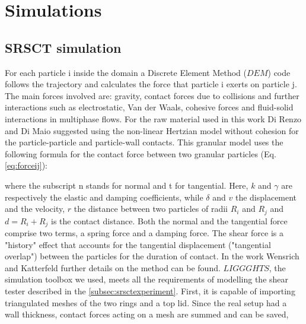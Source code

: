 \begin{appendix}
\label{appendix}

\section{Simulations}
\label{sec:appsimulations}

\subsection{SRSCT simulation}
\label{subsec:srsctsimulation}
For each particle i inside the domain a Discrete Element Method ($DEM$) code
follows the trajectory and calculates the force that particle i exerts on particle j.
The main forces involved are: gravity, contact forces due to collisions and further interactions such as electrostatic, 
Van der Waals, cohesive forces and fluid-solid interactions in multiphase flows. For the raw material used in this work 
Di Renzo and Di Maio \cite{RefWorks:145} suggested using the non-linear Hertzian model without cohesion for 
the particle-particle and particle-wall contacts. 
This granular model uses the following formula for the contact force between two granular particles (Eq. \ref{eq:forceij}):

where the subscript n stands for normal and t for tangential. 
Here, $k$ and $\gamma$ are respectively the elastic and damping coefficients, 
while $\delta$ and $v$ the displacement and the velocity, $r$ the distance
between two particles of radii $R_i$ and $R_j$ and $d = R_i + R_j $ is the
contact distance.
Both the normal and the tangential
force comprise two terms, a spring force and a damping force. 
The shear force is a "history" effect that accounts for the tangential displacement 
("tangential overlap") between the particles for the duration of contact. 
In the work Wensrich and Katterfeld \cite{RefWorks:87} further details on the method can be found.
$LIGGGHTS$, the simulation toolbox we used, meets all the requirements of
modelling the shear tester described in the \ref{subsec:srsctexperiment}. 
First, it is capable of importing triangulated meshes of the two rings and a top lid. 
Since the real setup had a wall thickness, contact forces acting on a mesh are summed and can be saved, 

\end{appendix}
